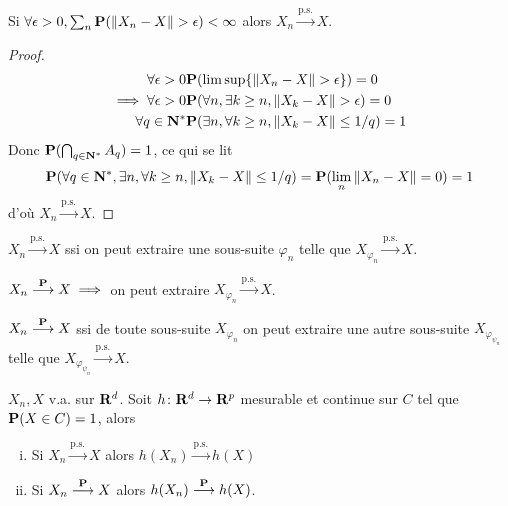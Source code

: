 	\begin{pop}
		Si $\forall \epsilon > 0, \sum_n \mathbf{P}(\left\lVert X_n - X\right\rVert > \epsilon) < \infty$ alors $X_n \overset{\text{p.s.}}{\longrightarrow} X$.
	\end{pop}
	
	\begin{proof}
		\begin{align*}
			\forall \epsilon > 0 & \mathbf{P}(\limsup \{ \left\lVert X_n - X\right\rVert > \epsilon \}) = 0 \\
			\implies \forall \epsilon > 0 & \mathbf{P}(\forall n, \exists k \geq n, \left\lVert X_k - X\right\rVert > \epsilon) = 0 \\
			\forall q \in \mathbf{N}^* & \mathbf{P}(\exists n, \forall k \geq n, \left\lVert X_k - X\right\rVert \leq 1/q) = 1
		\end{align*}
		Donc $\mathbf{P}(\bigcap_{q \in \mathbf{N}^*} A_q) = 1$, ce qui se lit
		$$\mathbf{P}(\forall q \in \mathbf{N}^*, \exists n, \forall k \geq n, \left\lVert X_k - X\right\rVert \leq 1/q) = \mathbf{P}(\lim_n \left\lVert X_n - X\right\rVert = 0) = 1$$
		d'où $X_n \overset{\text{p.s.}}{\longrightarrow} X$.
	\end{proof}

	\begin{pop}
		$X_n \overset{\text{p.s.}}{\longrightarrow} X$ ssi on peut extraire une sous-suite $\varphi_n$ telle que $X_{\varphi_n} \overset{\text{p.s.}}{\longrightarrow} X$.
	\end{pop}
	
	\begin{pop}
		$X_n \overset{\mathbf{P}}{\longrightarrow} X \implies$ on peut extraire $X_{\varphi_n} \overset{\text{p.s.}}{\longrightarrow} X$.
	\end{pop}

	\begin{pop}
		$X_n \overset{\mathbf{P}}{\longrightarrow} X$ ssi de toute sous-suite $X_{\varphi_n}$ on peut extraire une autre sous-suite $X_{\varphi_{\psi_n}}$ telle que $X_{\varphi_{\psi_n}} \overset{\text{p.s.}}{\longrightarrow} X$.
	\end{pop}

	\begin{thm}[de continuité]
		$X_n, X$ v.a. sur $\mathbf{R}^d$.
		Soit $h \colon \mathbf{R}^d \to \mathbf{R}^p$ mesurable et continue sur $C$ tel que $\mathbf{P}(X \in C) = 1$, alors
		\begin{enumerate}[(i)]
			\item Si $X_n \overset{\text{p.s.}}{\longrightarrow} X$ alors $h(X_n) \overset{\text{p.s.}}{\longrightarrow} h(X)$
			\item Si $X_n \overset{\mathbf{P}}{\longrightarrow} X$ alors $h(X_n) \overset{\mathbf{P}}{\longrightarrow} h(X)$.
		\end{enumerate}
	\end{thm}

